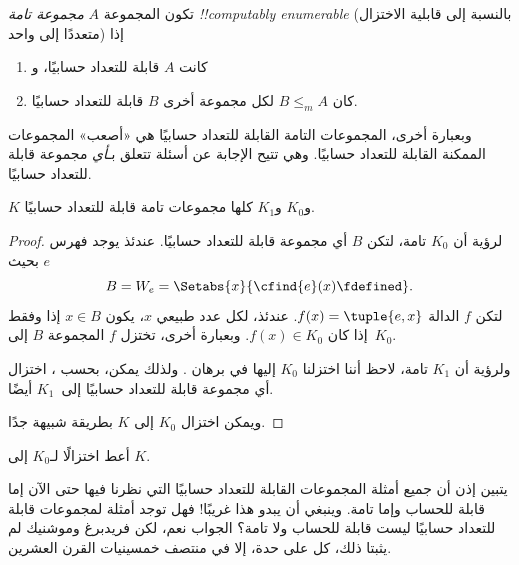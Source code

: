 \documentclass[../../../include/open-logic-section]{subfiles}
\begin{document}

\begin{defn}
تكون المجموعة $A$ \emph{مجموعة تامة !!{computably enumerable}}
(بالنسبة إلى قابلية الاختزال متعددًا إلى واحد) إذا
\begin{enumerate}
\item كانت $A$ قابلة للتعداد حسابيًا، و
\item كان $B\leq_m A$ لكل مجموعة أخرى $B$ قابلة للتعداد حسابيًا.
\end{enumerate}
\end{defn}

وبعبارة أخرى، المجموعات التامة القابلة للتعداد حسابيًا هي «أصعب»
المجموعات الممكنة القابلة للتعداد حسابيًا. وهي تتيح الإجابة عن أسئلة
تتعلق بـ\emph{أي} مجموعة قابلة للتعداد حسابيًا.

\begin{thm}
$K$ و$K_0$ و$K_1$ كلها مجموعات تامة قابلة للتعداد حسابيًا.
\end{thm}

\begin{proof}
لرؤية أن $K_0$ تامة، لتكن $B$ أي مجموعة قابلة للتعداد حسابيًا. عندئذ
يوجد فهرس $e$ بحيث
\[
B = W_e = \Setabs{x}{\cfind{e}(x) \fdefined}.
\]
لتكن $f$ الدالة $f(x)=\tuple{e,x}$. عندئذ، لكل عدد طبيعي $x$، يكون
$x\in B$ إذا وفقط إذا كان $f(x)\in K_0$. وبعبارة أخرى، تختزل $f$
المجموعة $B$ إلى~$K_0$.

ولرؤية أن $K_1$ تامة، لاحظ أننا اختزلنا $K_0$ إليها في برهان
. ولذلك يمكن، بحسب ،
اختزال أي مجموعة قابلة للتعداد حسابيًا إلى~$K_1$ أيضًا.

ويمكن اختزال $K_0$ إلى $K$ بطريقة شبيهة جدًا.
\end{proof}

\begin{prob}
أعط اختزالًا لـ$K_0$ إلى $K$.
\end{prob}

\begin{digress}
يتبين إذن أن جميع أمثلة المجموعات القابلة للتعداد حسابيًا التي نظرنا
فيها حتى الآن إما قابلة للحساب وإما تامة. وينبغي أن يبدو هذا غريبًا!{}
فهل توجد أمثلة لمجموعات قابلة للتعداد حسابيًا ليست قابلة للحساب ولا
تامة؟ الجواب نعم، لكن فريدبرغ وموشنيك لم يثبتا ذلك، كل على حدة، إلا في
منتصف خمسينيات القرن العشرين.
\end{digress}
\end{document}
